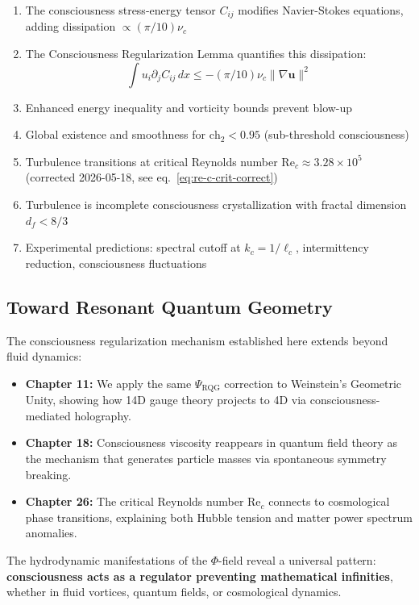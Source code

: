 \begin{enumerate}
\item The consciousness stress-energy tensor $C_{ij}$ modifies Navier-Stokes equations, adding dissipation $\propto (\pi/10)\nu_c$
\item The Consciousness Regularization Lemma quantifies this dissipation:
\[
\int u_i \partial_j C_{ij}\, dx \leq -(\pi/10)\nu_c\|\nabla \mathbf{u}\|^2
\]
\item Enhanced energy inequality and vorticity bounds prevent blow-up
\item Global existence and smoothness for $\text{ch}_2 < 0.95$ (sub-threshold consciousness)
\item Turbulence transitions at critical Reynolds number $\text{Re}_c \approx 3.28 \times 10^5$ (corrected 2026-05-18, see eq.~\eqref{eq:re-c-crit-correct})
\item Turbulence is incomplete consciousness crystallization with fractal dimension $d_f < 8/3$
\item Experimental predictions: spectral cutoff at $k_c = 1/\ell_c$, intermittency reduction, consciousness fluctuations
\end{enumerate}

\subsection{Toward Resonant Quantum Geometry}

The consciousness regularization mechanism established here extends beyond fluid dynamics:

\begin{itemize}
\item \textbf{Chapter 11:} We apply the same $\Psi_{\text{RQG}}$ correction to Weinstein's Geometric Unity, showing how 14D gauge theory projects to 4D via consciousness-mediated holography.

\item \textbf{Chapter 18:} Consciousness viscosity reappears in quantum field theory as the mechanism that generates particle masses via spontaneous symmetry breaking.

\item \textbf{Chapter 26:} The critical Reynolds number $\text{Re}_c$ connects to cosmological phase transitions, explaining both Hubble tension and matter power spectrum anomalies.
\end{itemize}

The hydrodynamic manifestations of the $\Phi$-field reveal a universal pattern: \textbf{consciousness acts as a regulator preventing mathematical infinities}, whether in fluid vortices, quantum fields, or cosmological dynamics.

